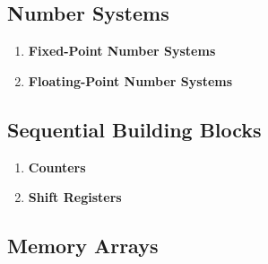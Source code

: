 \documentclass[12pt]{article}
\begin{document}
\subsection{Number Systems}

\begin{enumerate}
  \item \textbf{Fixed-Point Number Systems}

  \item \textbf{Floating-Point Number Systems}
\end{enumerate}

\subsection{Sequential Building Blocks}

\begin{enumerate}
  \item \textbf{Counters}

  \item \textbf{Shift Registers}
\end{enumerate}

\subsection{Memory Arrays}
\end{document}
